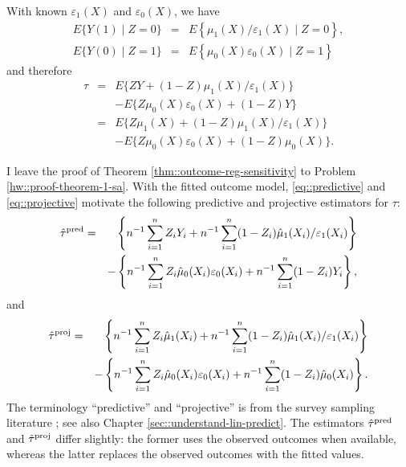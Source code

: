 \begin{theorem}
\label{thm::outcome-reg-sensitivity}
With known $\varepsilon_1(X)$ and $ \varepsilon_0(X) $, we have 
\begin{eqnarray*}
E\{ Y(1)\mid Z=0 \}   &=& E\left\{\mu_1(X)   / \varepsilon_1(X)  \mid Z=0\right\},\\ 
E\{ Y(0)\mid Z=1 \}   &=& E\left\{\mu_0(X)    \varepsilon_0(X)  \mid Z=1\right\}
\end{eqnarray*} 
and therefore
\begin{eqnarray}
\tau & = & E\{ ZY + (1-Z) \mu_1(X)   / \varepsilon_1(X)\}  \nonumber  \\
 && - E\{ Z \mu_0(X)    \varepsilon_0(X) + (1-Z)Y\}  \label{eq::predictive}\\
& = & E\{ Z \mu_1(X) + (1-Z) \mu_1(X)   / \varepsilon_1(X)\}  \nonumber \\
&&- E\{ Z \mu_0(X)    \varepsilon_0(X) + (1-Z) \mu_0(X)\}. \label{eq::projective}
\end{eqnarray}
\end{theorem}


 


I leave the proof of Theorem \ref{thm::outcome-reg-sensitivity} to Problem \ref{hw::proof-theorem-1-sa}. 
With the fitted outcome model, \eqref{eq::predictive} and \eqref{eq::projective} motivate the following predictive and projective estimators for $\tau$:
\begin{eqnarray*}
\hat\tau^{\textup{pred}} &=&\left\{  n^{-1}\sum_{i=1}^n Z_i Y_i + n^{-1} \sum_{i=1}^n (1-Z_i) \hat{\mu}_1(X_i)   / \varepsilon_1(X_i)  \right\} \\
&&- \left\{ n^{-1}  \sum_{i=1}^n Z_i \hat{\mu}_0(X_i)    \varepsilon_0(X_i) + n^{-1} \sum_{i=1}^n (1-Z_i) Y_i \right\},
\end{eqnarray*}
and
\begin{eqnarray*}
\hat{\tau}^{\textup{proj}}&=&\left\{ n^{-1}\sum_{i=1}^n Z_{i}\hat{\mu}_{1}(X_{i})+n^{-1}\sum_{i=1}^n(1-Z_{i})\hat{\mu}_{1}(X_{i})/\varepsilon_{1}(X_{i})\right\} \\
&&-\left\{ n^{-1}\sum_{i=1}^n Z_{i}\hat{\mu}_{0}(X_{i})\varepsilon_{0}(X_{i})+n^{-1}\sum_{i=1}^n(1-Z_{i})\hat{\mu}_{0}(X_{i})\right\}.
\end{eqnarray*} 
The terminology ``predictive'' and ``projective'' is from the survey sampling literature \citep{firth1998robust, ding2018causal}; see also Chapter \ref{sec::understand-lin-predict}. The estimators $\hat\tau^{\textup{pred}} $ and $\hat{\tau}^{\textup{proj}}$ differ slightly: the former uses the observed outcomes when available, whereas the latter replaces the observed outcomes with the fitted values. 





